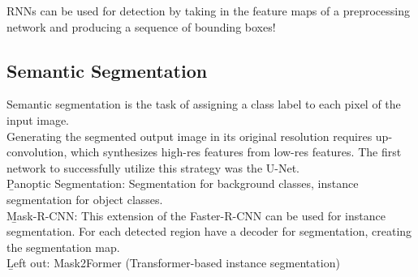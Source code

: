 RNNs can be used for detection by taking in the feature maps of a preprocessing network and producing a sequence of bounding boxes!

\subsection{Semantic Segmentation}
Semantic segmentation is the task of assigning a class label to each pixel of the input image.\\
Generating the segmented output image in its original resolution requires up-convolution, which synthesizes high-res features from low-res features. The first network to successfully utilize this strategy was the U-Net.\\

\b{Panoptic Segmentation:} Segmentation for background classes, instance segmentation for object classes.\\

\b{Mask-R-CNN:}
This extension of the Faster-R-CNN can be used for instance segmentation. For each detected region have a decoder for segmentation, creating the segmentation map.\\

\b{Left out: Mask2Former} (Transformer-based instance segmentation)

\newpage
